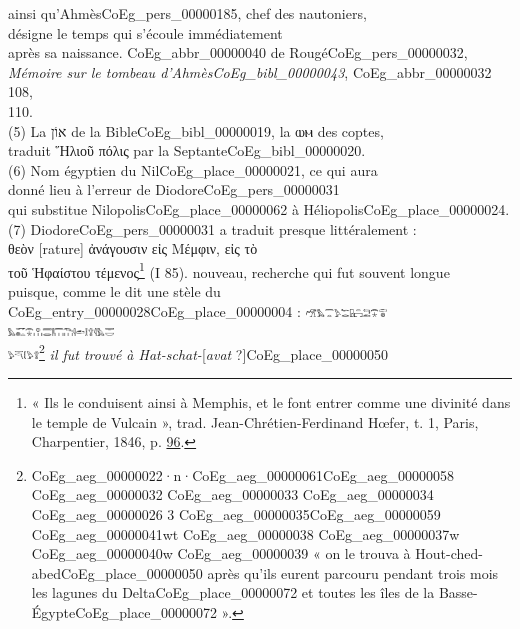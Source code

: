 \documentclass{book}
\begin{document}
{\begin{paracol}{2}
ainsi qu’Ahmès\gls{CoEg_pers_00000185}, chef des nautoniers,\\
désigne le temps qui s’écoule immédiatement\\
après sa naissance. \Gls{CoEg_abbr_00000040} de Rougé\gls{CoEg_pers_00000032},\\
\textit{Mémoire sur le tombeau d’Ahmès\gls{CoEg_bibl_00000043}}, \gls{CoEg_abbr_00000032} 108,\\
110.\\
(5) La \foreignlanguage{hebrew}{אוֹן} de la Bible\gls{CoEg_bibl_00000019}, la \foreignlanguage{coptic}{ⲱⲙ} des coptes,\\
traduit Ἥλιοῦ πόλις par la Septante\gls{CoEg_bibl_00000020}.\\
(6) Nom égyptien du Nil\gls{CoEg_place_00000021}, ce qui aura\\
donné lieu à l’erreur de Diodore\gls{CoEg_pers_00000031}\\
qui substitue Nilopolis\gls{CoEg_place_00000062} à Héliopolis\gls{CoEg_place_00000024}.\\
(7) Diodore\gls{CoEg_pers_00000031} a traduit presque littéralement :\\
θεὸν [rature] ἀνάγουσιν εἰς Μέμφιν, εἰς τὸ\\
τοῦ Ἡφαίστου τέμενος\footnote{« Ils le conduisent ainsi à Memphis, et le font entrer comme une divinité dans le temple de Vulcain », trad. Jean-Chrétien-Ferdinand Hœfer, t. 1, Paris, Charpentier, 1846, p. \href{https://gallica.bnf.fr/ark:/12148/bpt6k54537384/f127.item}{96}.} (I 85).
\switchcolumn
\noindent nouveau, recherche qui fut souvent longue\\
puisque, comme le dit une stèle du\\
\Gls{CoEg_entry_00000028}\gls{CoEg_place_00000004} : \includegraphics[height=6pt]{CoEg_Mariette_hiero_1857-04-01_7_1_1.png}\\
\includegraphics[height=6pt]{CoEg_Mariette_hiero_1857-04-01_7_1_2.png}\\
\includegraphics[height=6pt]{CoEg_Mariette_hiero_1857-04-01_7_1_3.png}\footnote{\foreignlanguage{translit}{\Gls{CoEg_aeg_00000022}·n·\gls{CoEg_aeg_00000061}\gls{CoEg_aeg_00000058} \gls{CoEg_aeg_00000032} \gls{CoEg_aeg_00000033} \gls{CoEg_aeg_00000034} \gls{CoEg_aeg_00000026} 3 \gls{CoEg_aeg_00000035}\gls{CoEg_aeg_00000059} \gls{CoEg_aeg_00000041}wt \gls{CoEg_aeg_00000038} \gls{CoEg_aeg_00000037}w \gls{CoEg_aeg_00000040}w \gls{CoEg_aeg_00000039}} « on le trouva à Hout-ched-abed\gls{CoEg_place_00000050} après qu'ils eurent parcouru pendant trois mois les lagunes du Delta\gls{CoEg_place_00000072} et toutes les îles de la Basse-Égypte\gls{CoEg_place_00000072} ».} \textit{il fut trouvé à Hat-schat-}[\textit{avat} ?]\gls{CoEg_place_00000050}\\

\end{paracol}}
\end{document}
